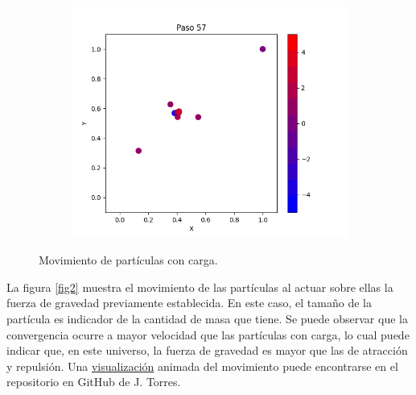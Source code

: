 \documentclass{report}
\begin{document}
\begin{figure}[h]
\begin{subfigure}[b]{0.3\textwidth}
         \includegraphics[width=\textwidth]{Images/Images_c/p9pc_t57.png}
     \end{subfigure}
     \caption{Movimiento de part\'iculas con carga.}
     \label{fig1}
\end{figure}

\newpage

La figura \ref{fig2} muestra el movimiento de las part\'iculas al actuar sobre ellas la fuerza de gravedad previamente establecida. En este caso, el tama\~no de la part\'icula es indicador de la cantidad de masa que tiene. Se puede observar que la convergencia ocurre a mayor velocidad que las part\'iculas con carga, lo cual puede indicar que, en este universo, la fuerza de gravedad es mayor que las de atracci\'on y repulsi\'on. Una \href{https://github.com/FeroxDeitas/Simulacion-Nano/blob/main/Tareas/P9/Images/images_m/movement_m.gif}{visualizaci\'on} animada del movimiento puede encontrarse en el repositorio en GitHub de J. Torres.
\end{document}
